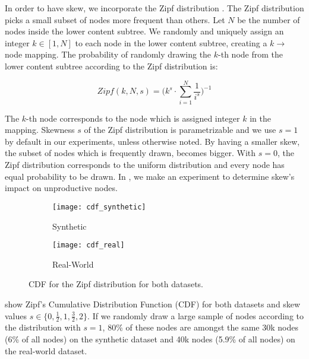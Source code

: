 \documentclass[abstracton,12pt]{scrartcl}
\theoremstyle{definition}
\begin{document}
In order to have skew, we incorporate the Zipf distribution \cite{zipf}. The Zipf
distribution picks a small subset of nodes more frequent than others. 
Let $N$ be the number of nodes inside the lower content subtree.
We randomly and uniquely assign an integer $k \in [1, N]$ to each node in the
lower content subtree, creating 
a $k \rightarrow$ node mapping. The probability of randomly drawing the $k$-th node 
from the lower content subtree according to the Zipf distribution is:

\vspace{-0.5cm}

$$ Zipf(k,N,s) = \bigg(k^s \cdot \sum_{i=1}^{N}\frac{1}{i^s} \bigg)^{-1} $$

\vspace{0.2cm}

The $k$-th node corresponds to the node which is assigned integer $k$ in the mapping.
Skewness $s$ of the Zipf distribution is parametrizable and we use $s=1$ by
default in our experiments, unless otherwise noted. By having a smaller skew,
the subset of nodes which is frequently drawn, becomes bigger.
With $s=0$, the Zipf distribution corresponds to the uniform distribution
and every node has equal probability to be drawn.
In , we make an experiment to determine skew's impact on
unproductive nodes.

\begin{figure}[h]
  \centering
   \begin{subfigure}{0.49\linewidth}
    \centering
    \caption{Synthetic}
    \texttt{[image: cdf\_synthetic]}
    \label{fig:cdf_synthetic}
  \end{subfigure}
  \begin{subfigure}{0.49\linewidth}
    \centering
    \caption{Real-World}
    \texttt{[image: cdf\_real]}
    \label{fig:cdf_real}
  \end{subfigure}
  \vspace{-0.9cm}
  \caption[CDF for the Zipf distribution for both datasets]{
  CDF for the Zipf distribution for both datasets.}
\end{figure}


 show Zipf's Cumulative Distribution
Function (CDF) for both datasets and skew values $s \in \{0, \frac{1}{2}, 1, \frac{3}{2}, 2\}$.
If we randomly draw a large sample of nodes according to the distribution with $s=1$,
80\% of these nodes are amongst the same 30k nodes (6\% of all nodes) on the synthetic
dataset and 40k nodes (5.9\% of all nodes) on the real-world dataset.
\end{document}
